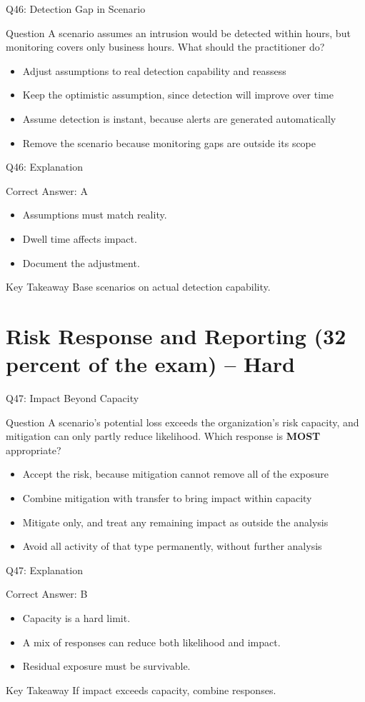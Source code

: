 \documentclass[aspectratio=169]{beamer}
\newcommand{\hq}[7]{%
	\begin{frame}{Q#1: #2}
		\begin{block}{Question}
			#3
		\end{block}
		\begin{itemize}
			#4
		\end{itemize}
	\end{frame}
	\begin{frame}{Q#1: Explanation}
		\begin{block}{Correct Answer: #5}
			\begin{itemize}
				#6
			\end{itemize}
		\end{block}
		\begin{alertblock}{Key Takeaway}
			#7
		\end{alertblock}
	\end{frame}
}
\begin{document}
	\hq{46}{Detection Gap in Scenario}
	{A scenario assumes an intrusion would be detected within hours, but monitoring covers only business hours. What should the practitioner do?}
	{\item[\textbf{(A)}] Adjust assumptions to real detection capability and reassess
		\item[\textbf{(B)}] Keep the optimistic assumption, since detection will improve over time
		\item[\textbf{(C)}] Assume detection is instant, because alerts are generated automatically
		\item[\textbf{(D)}] Remove the scenario because monitoring gaps are outside its scope}
	{A}
	{\item Assumptions must match reality.
		\item Dwell time affects impact.
		\item Document the adjustment.}
	{Base scenarios on actual detection capability.}

	\section{Risk Response and Reporting (32 percent of the exam) -- Hard}

	\hq{47}{Impact Beyond Capacity}
	{A scenario's potential loss exceeds the organization's risk capacity, and mitigation can only partly reduce likelihood. Which response is \textbf{MOST} appropriate?}
	{\item[\textbf{(A)}] Accept the risk, because mitigation cannot remove all of the exposure
		\item[\textbf{(B)}] Combine mitigation with transfer to bring impact within capacity
		\item[\textbf{(C)}] Mitigate only, and treat any remaining impact as outside the analysis
		\item[\textbf{(D)}] Avoid all activity of that type permanently, without further analysis}
	{B}
	{\item Capacity is a hard limit.
		\item A mix of responses can reduce both likelihood and impact.
		\item Residual exposure must be survivable.}
	{If impact exceeds capacity, combine responses.}
\end{document}
